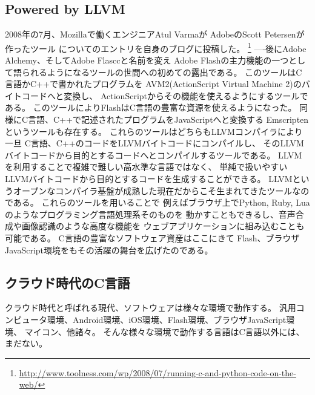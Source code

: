 \subsection{Powered by LLVM} %
2008年の7月、Mozillaで働くエンジニアAtul Varmaが
AdobeのScott Petersenが作ったツール
についてのエントリを自身のブログに投稿した。
\footnote{\url{http://www.toolness.com/wp/2008/07/running-c-and-python-code-on-the-web/}}
----後にAdobe Alchemy、そしてAdobe Flasccと名前を変え
Adobe Flashの主力機能の一つとして語られるようになるツールの世間への初めての露出である。
このツールはC言語かC++で書かれたプログラムを
AVM2(ActionScript Virtual Machine 2)のバイトコードへと変換し、
ActionScriptからその機能を使えるようにするツールである。
このツールによりFlashはC言語の豊富な資源を使えるようになった。
同様にC言語、C++で記述されたプログラムをJavaScriptへと変換する
Emscriptenというツールも存在する。
これらのツールはどちらもLLVMコンパイラにより一旦
C言語、C++のコードをLLVMバイトコードにコンパイルし、
そのLLVMバイトコードから目的とするコードへとコンパイルするツールである。
LLVMを利用することで複雑で難しい高水準な言語ではなく、
単純で扱いやすいLLVMバイトコードから目的とするコードを生成することができる。
LLVMというオープンなコンパイラ基盤が成熟した現在だからこそ生まれてきたツールなのである。
これらのツールを用いることで
例えばブラウザ上でPython, Ruby, Luaのようなプログラミング言語処理系そのものを
動かすこともできるし、音声合成や画像認識のような高度な機能を
ウェブアプリケーションに組み込むことも可能である。
C言語の豊富なソフトウェア資産はここにきて
Flash、ブラウザJavaScript環境をもその活躍の舞台を広げたのである。

\subsection{クラウド時代のC言語}
クラウド時代と呼ばれる現代、ソフトウェアは様々な環境で動作する。
汎用コンピュータ環境、Android環境、iOS環境、Flash環境、ブラウザJavaScript環境、
マイコン、他諸々。
そんな様々な環境で動作する言語はC言語以外には、まだない。

% 
% 
% 


